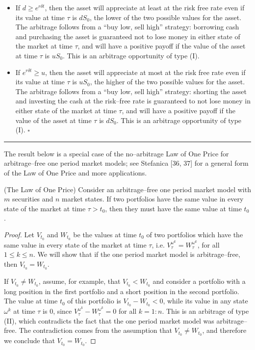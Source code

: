 \begin{itemize}
\item If $d \geq e^{r\delta t}$, then the asset will appreciate at least at
the risk free rate even if its value at time $\tau$ is $dS_0$, the lower of
the two possible values for the asset. The arbitrage follows from a
``buy low, sell high'' strategy: borrowing cash and purchasing the asset is
guaranteed not to lose money in either state of the market at time $\tau$,
and will have a positive payoff if the value of the asset at time $\tau$ is
$uS_0$. This is an arbitrage opportunity of type (I).

\item If $e^{r\delta t} \geq u$, then the asset will appreciate at most at
the risk free rate even if its value at time $\tau$ is $uS_0$, the higher of
the two possible values for the asset. The arbitrage follows from a
``buy low, sell high'' strategy: shorting the asset and investing the cash
at the risk--free rate is guaranteed to not lose money in either state of
the market at time $\tau$, and will have a positive payoff if the value of
the asset at time $\tau$ is $dS_0$. This is an arbitrage opportunity of type
(I). \hfill$\square$
\end{itemize}

\medskip
\noindent\rule{\linewidth}{0.4pt}
\medskip

The result below is a special case of the no--arbitrage Law of One Price for
arbitrage--free one period market models; see Stefanica [36, 37] for a
general form of the Law of One Price and more applications.

\begin{theorem}
(The Law of One Price) Consider an arbitrage--free one period market model
with $m$ securities and $n$ market states. If two portfolios have the same
value in every state of the market at time $\tau > t_0$, then they must
have the same value at time $t_0$.
\end{theorem}

\begin{proof}
Let $V_{t_0}$ and $W_{t_0}$ be the values at time $t_0$ of two portfolios
which have the same value in every state of the market at time $\tau$, i.e.
$V_\tau^{\omega^k} = W_\tau^{\omega^k}$, for all $1 \leq k \leq n$. We will
show that if the one period market model is arbitrage--free, then $V_{t_0} =
W_{t_0}$.

If $V_{t_0} \neq W_{t_0}$, assume, for example, that $V_{t_0} < W_{t_0}$ and
consider a portfolio with a long position in the first portfolio and a short
position in the second portfolio. The value at time $t_0$ of this portfolio
is $V_{t_0} - W_{t_0} < 0$, while its value in any state $\omega^k$ at time
$\tau$ is $0$, since $V_\tau^{\omega^k} - W_\tau^{\omega^k} = 0$ for all $k =
1:n$. This is an arbitrage of type (II), which contradicts the fact that the
one period market model was arbitrage--free. The contradiction comes from
the assumption that $V_{t_0} \neq W_{t_0}$, and therefore we conclude that
$V_{t_0} = W_{t_0}$.
\end{proof}

